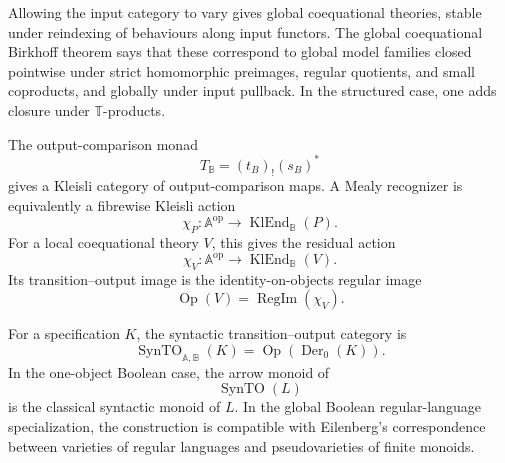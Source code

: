 Allowing the input category to vary gives global coequational theories, stable
under reindexing of behaviours along input functors. The global coequational
Birkhoff theorem says that these correspond to global model families closed
pointwise under strict homomorphic preimages, regular quotients, and small
coproducts, and globally under input pullback. In the structured case, one adds
closure under \(\mathbb T\)-products.

The output-comparison monad
\[
    T_{\mathbb B}=(t_B)_!(s_B)^*
\]
gives a Kleisli category of output-comparison maps. A Mealy recognizer is
equivalently a fibrewise Kleisli action
\[
    \chi_P:
    \mathbb A^{\mathrm{op}}
    \to
    \operatorname{KlEnd}_{\mathbb B}(P).
\]
For a local coequational theory \(V\), this gives the residual action
\[
    \chi_V:
    \mathbb A^{\mathrm{op}}
    \to
    \operatorname{KlEnd}_{\mathbb B}(V).
\]
Its transition--output image is the identity-on-objects regular image
\[
    \operatorname{Op}(V)
    =
    \operatorname{RegIm}(\chi_V).
\]

For a specification \(K\), the syntactic transition--output category is
\[
    \operatorname{SynTO}_{\mathbb A,\mathbb B}(K)
    =
    \operatorname{Op}(\operatorname{Der}_0(K)).
\]
In the one-object Boolean case, the arrow monoid of
\[
    \operatorname{SynTO}(L)
\]
is the classical syntactic monoid of \(L\). In the global Boolean
regular-language specialization, the construction is compatible with
Eilenberg's correspondence between varieties of regular languages and
pseudovarieties of finite monoids.
